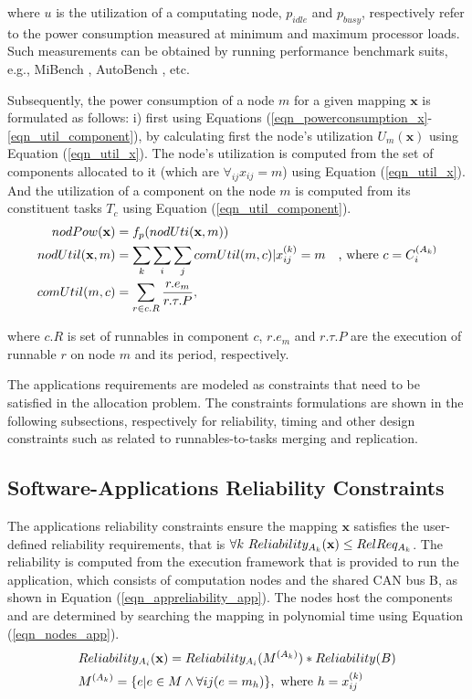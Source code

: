 where $u$ is the utilization of a computating node, $p_{idle}$ and $p_{busy}$, respectively refer to the power consumption measured at minimum and maximum processor loads. Such measurements can be obtained by running performance benchmark suits, e.g., MiBench \cite{Guthaus2001MiBench:Suite}, AutoBench \cite{EMBC2018AutoBenchProcessors}, etc.

Subsequently, the power consumption of a node $m$ for a given mapping $\textbf{x}$ is formulated as follows: i) first using Equations (\ref{eqn_powerconsumption_x}-\ref{eqn_util_component}), by calculating first the node's utilization $U_m(\textbf{x})$ using Equation (\ref{eqn_util_x}). The node's utilization is computed from the set of components allocated to it (which are $\forall_{ij} x_{ij}=m$) using Equation (\ref{eqn_util_x}). And the utilization of a component on the node $m$ is computed from its constituent tasks $T_c$ using Equation (\ref{eqn_util_component}).
\begin{align}
	\label{eqn_powerconsumption_x}
nodPow(\textbf{x}) & =f_p(nodUti(\textbf{x},m))                         &  \\
	\label{eqn_util_x}
nodUtil(\textbf{x},m)           & = \sum_{k}{\sum_{i}{\sum_{j}{comUtil(m,c)}}}|\xkij=m         & \text{, where } c=\sss{C}\\
	\label{eqn_util_component}
comUtil(m,c)              & = \sum_{r\in c.R} \frac{r.e_m}{r.\tau.P}, &
\end{align}

where $c.R$ is set of runnables in component $c$, $r.e_m$ and $r.\tau.P$ are the execution of runnable $r$ on node $m$ and its period, respectively.

The applications requirements are modeled as constraints that need to be satisfied in the allocation problem. The constraints formulations are shown in the following subsections, respectively for reliability, timing and other design constraints such as related to runnables-to-tasks merging and replication.

\subsection{Software-Applications Reliability Constraints}\label{subsec_reliability_constraint}
The applications reliability constraints ensure the mapping $\textbf{x}$ satisfies the user-defined reliability requirements, that is $\forall k\ Reliability_{A_k}(\textbf{x})\leq RelReq_{A_k}$. 
The reliability  is computed from the execution framework that is provided to run the application, which consists of computation nodes  and the shared CAN bus B, as shown in Equation (\ref{eqn_appreliability_app}). The nodes host the components  and are determined by searching the mapping   in polynomial time using Equation (\ref{eqn_nodes_app}).
\begin{align}
	\label{eqn_appreliability_app}
	&Reliability_{A_i}(\x)=Reliability_{A_i}(\ssp{M})*Reliability(B)\\
	\label{eqn_nodes_app}
	&\ssp{M}=\{e|e\in M \land \forall ij (e=m_h) \},\mbox{ where } h=\ssx{k}{ij} 
\end{align}

